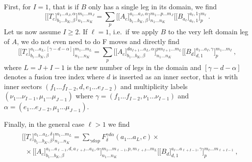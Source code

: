 First, for $I = 1$, that is if $B$ only has a single leg in its domain, we find
\begin{equation}
    \Big[ \big[ T_c \big]^{a_1\dots a_J,\alpha}_{b_1\dots b_K, \beta} \Big]^{m_1\dots m_J}_{n_1\dots n_K}
    = \sum_p 
    \Big[ \big[ A_c \big]^{a_1\dots a_J,\alpha}_{b_1\dots b_K, \beta} \Big]^{m_1\dots p \dots m_J}_{n_1\dots n_K}
    \Big[ \big[ B_{a_\ell} \big]^{a_\ell, 1}_{a_\ell, 1} \Big]^{m_\ell}_{p}
    ~.
\end{equation}
%
Let us now assume $I \geq 2$.
%
If $\ell = 1$, i.e.~if we apply $B$ to the very left domain leg of $A$, we do not even need to do F moves and directly find
\begin{equation}
    \Big[ \big[ T_c \big]^{a_1\dots a_L,[\gamma-d-\alpha]}_{b_1\dots b_K, \beta} \Big]^{m_1\dots m_L}_{n_1\dots n_K}
    =
    \sum_p
    \Big[ \big[ A_c \big]^{d a_{I+1}\dots a_L,\alpha}_{b_1\dots b_K, \beta} \Big]^{p m_{I+1}\dots m_L}_{n_1\dots n_K}
    \Big[ \big[ B_d \big]^{a_1\dots a_I,\gamma}_{d,1} \Big]^{m_{1}\dots m_I}_{p}
    ~,
\end{equation}
where $L = J + I - 1$ is the new number of legs in the domain and $[\gamma-d-\alpha]$ denotes a fusion tree index where $d$ is inserted as an inner sector, that is with inner sectors $(f_1\dots f_{I-2},d,e_1\dots e_{J-2})$ and multiplicity labels $(\nu_1 \dots \nu_{I-1},\mu_1\dots\mu_{J-1})$ where $\gamma = (f_1\dots f_{I-2}, \nu_1\dots\nu_{I-1})$ and $\alpha = (e_1\dots e_{J-2}, \mu_1\dots\mu_{J-1})$.

Finally, in the general case $\ell > 1$ we find
\begin{align}
    \begin{split}
        &\Big[ \big[ T_c \big]^{a_1\dots a_L,\delta}_{b_1\dots b_K, \beta} \Big]^{m_1\dots m_L}_{n_1\dots n_K}
        = \sum_{\gamma d \alpha p} F^{\gamma d \alpha}_\delta (a_1\dots a_L, c)
         \times
        \\
        & ~~ \times
        \Big[ \big[ A_c \big]^{a_1\dots a_{\ell-1}, d, a_{\ell+I}\dots a_L,\alpha}_{b_1\dots b_K, \beta} \Big]^{m_1\dots m_{\ell-1},p,m_{\ell+I} \dots m_L}_{n_1\dots n_K}
        \Big[ \big[ B_d \big]^{a_\ell \dots a_{\ell+I-1},\gamma}_{d, 1} \Big]^{m_\ell\dots m_{\ell+I-1}}_{p}
        ~,
    \end{split}
\end{align}

